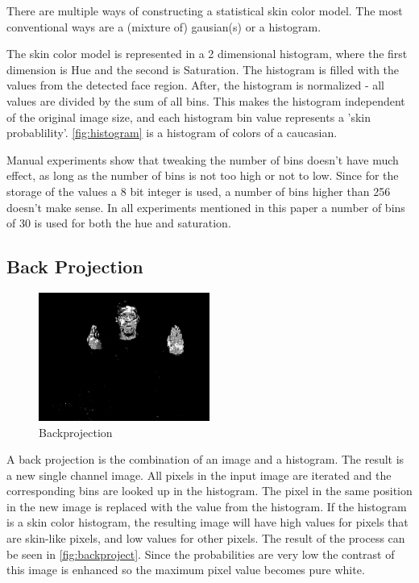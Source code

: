 There are multiple ways of constructing a statistical skin color model. The most conventional ways are a (mixture of) gausian(s) or a histogram. 

The skin color model is represented in a 2 dimensional histogram, where the first dimension is Hue and the second is Saturation. The histogram is filled with the values from the detected face region. After, the histogram is normalized - all values are divided by the sum of all bins. This makes the histogram independent of the original image size, and each histogram bin value represents a 'skin probablility'. \autoref{fig:histogram} is a histogram of colors of a caucasian.

Manual experiments show that tweaking the number of bins doesn't have much effect, as long as the number of bins is not too high or not to low. Since for the storage of the values a 8 bit integer is used, a number of bins higher than 256 doesn't make sense. In all experiments mentioned in this paper a number of bins of 30 is used for both the hue and saturation.

\subsection*{Back Projection}

\begin{figure}[htbp]
    \center{}
    \includegraphics[width=0.5\textwidth]{figures/pipeline/backproject.jpg}
 	\caption{Backprojection}
	\label{fig:backproject}
\end{figure}


A back projection is the combination of an image and a histogram. The result is a new single channel image. All pixels in the input image are iterated and the corresponding bins are looked up in the histogram. The pixel in the same position in the new image is replaced with the value from the histogram. If the histogram is a skin color histogram, the resulting image will have high values for pixels that are skin-like pixels, and low values for other pixels. The result of the process can be seen in \autoref{fig:backproject}. Since the probabilities are very low the contrast of this image is enhanced so the maximum pixel value becomes pure white.


